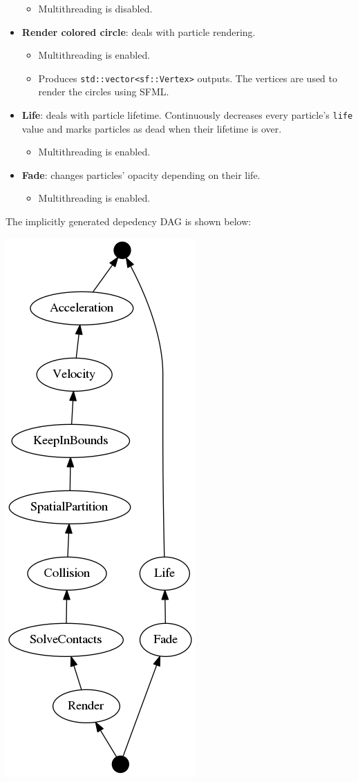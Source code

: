 \documentclass[twoside, 12pt, a4paper, openany]{book}
\let\origfigure=\figure
\let\endorigfigure=\endfigure
\renewenvironment{figure}[1][]{%
\origfigure[H]
}{%
\endorigfigure
}
\providecommand{\tightlist}{%
  \setlength{\itemsep}{0pt}\setlength{\parskip}{0pt}}
\begin{document}
\begin{itemize}
  \begin{itemize}
  \tightlist
  \item
    Multithreading is disabled.
  \end{itemize}
\item
  \textbf{Render colored circle}: deals with particle rendering.

  \begin{itemize}
  \item
    Multithreading is enabled.
  \item
    Produces
    \texttt{std::vector<sf::Vertex>}
    outputs. The vertices are used to render the circles using SFML.
  \end{itemize}
\item
  \textbf{Life}: deals with particle lifetime. Continuously decreases
  every particle's
  \texttt{life}
  value and marks particles as dead when their lifetime is over.

  \begin{itemize}
  \tightlist
  \item
    Multithreading is enabled.
  \end{itemize}
\item
  \textbf{Fade}: changes particles' opacity depending on their life.

  \begin{itemize}
  \tightlist
  \item
    Multithreading is enabled.
  \end{itemize}
\end{itemize}

The implicitly generated depedency DAG is shown below:

\begin{figure}[htbp]
\centering
\includegraphics[height=0.85000\textwidth]{source/figures/generated/sim/dag0.png}
\caption{Particle simulation: dependency DAG}
\end{figure}
\end{document}
